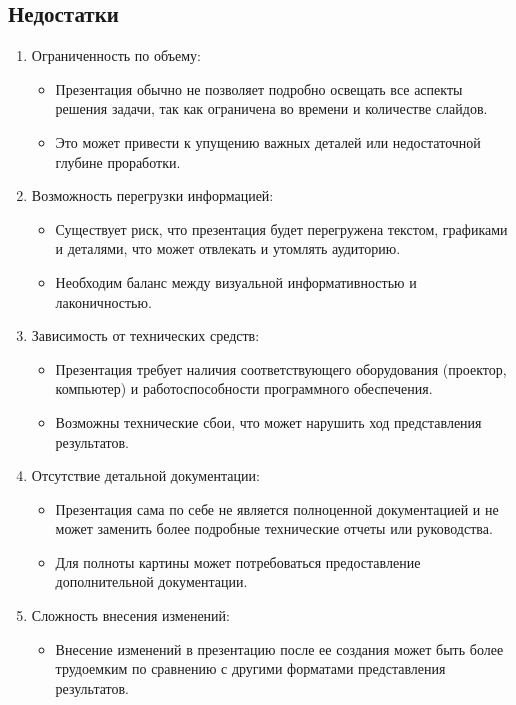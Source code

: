 \subsection*{Недостатки}
\begin{enumerate}
    \item Ограниченность по объему:
        \begin{itemize}
            \item Презентация обычно не позволяет подробно освещать все аспекты решения задачи, так как ограничена во времени и количестве слайдов.
            \item Это может привести к упущению важных деталей или недостаточной глубине проработки.
        \end{itemize}
    \item Возможность перегрузки информацией:
        \begin{itemize}
            \item Существует риск, что презентация будет перегружена текстом, графиками и деталями, что может отвлекать и утомлять аудиторию.
            \item Необходим баланс между визуальной информативностью и лаконичностью.
        \end{itemize}
    \item Зависимость от технических средств:
        \begin{itemize}
            \item Презентация требует наличия соответствующего оборудования (проектор, компьютер) и работоспособности программного обеспечения.
            \item Возможны технические сбои, что может нарушить ход представления результатов.
        \end{itemize}
    \item Отсутствие детальной документации:
        \begin{itemize}
            \item Презентация сама по себе не является полноценной документацией и не может заменить более подробные технические отчеты или руководства.
            \item Для полноты картины может потребоваться предоставление дополнительной документации.
        \end{itemize}
    \item Сложность внесения изменений:
        \begin{itemize}
            \item Внесение изменений в презентацию после ее создания может быть более трудоемким по сравнению с другими форматами представления результатов.
        \end{itemize}
\end{enumerate}

